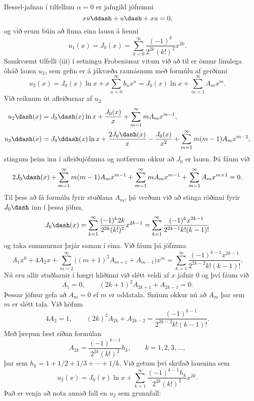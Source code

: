 Bessel-jafnan í tilfellinu ${\alpha}=0$ er jafngild jöfnunni
\begin{equation*}
xu\ddash+u\dash+xu=0,
\label{3.5.5}
\end{equation*}
og við erum búin að finna eina lausn á henni
$$
u_1(x)=J_0(x)=\sum\limits_{k=0}^{\infty}
\dfrac{(-1)^k}{2^{2k}(k!)^2}x^{2k}.
$$
Samkvæmt tilfelli (iii) í setningu Frobeniusar vitum við að
til er önnur línulega óháð lausn $u_2$, sem gefin er á jákvæða raunásnum
með formúlu af gerðinni
\begin{equation*}
u_2(x)=J_0(x)\ln x+x\sum\limits_{n=0}^{\infty} b_nx^n
=J_0(x)\ln x+\sum\limits_{m=1}^{\infty} A_mx^m.
\label{3.5.6}
\end{equation*}
Við reiknum út afleiðurnar af $u_2$ 
\begin{align*}
u_2\dash(x)&=J_0\dash(x)\ln x +\dfrac{J_0(x)}x+
\sum\limits_{m=1}^{\infty} mA_mx^{m-1},\\
u_2\ddash(x)&= J_0\ddash(x)\ln x+\dfrac{2J_0\dash(x)}x-\dfrac{J_0(x)}{x^2}
+\sum\limits_{m=1}^{\infty} m(m-1)A_mx^{m-2},
\end{align*}
stingum þeim inn í afleiðujöfnuna  og notfærum okkur að $J_0$
er lausn.  Þá fáum við
$$
2J_0\dash(x)+\sum\limits_{m=1}^{\infty} m(m-1)A_mx^{m-1}
+\sum\limits_{m=1}^{\infty} mA_mx^{m-1}
+\sum\limits_{m=1}^{\infty} A_mx^{m+1}=0.
$$
Til þess að fá formúlu fyrir stuðlana $A_m$, þá verðum við að stinga
röðinni fyrir $J_0\dash$ inn í þessa jöfnu,
$$
J_0\dash(x)=\sum \limits_{k=1}^{\infty}
\dfrac{(-1)^k2k}{2^{2k}(k!)^2}x^{2k-1}
=\sum \limits_{k=1}^{\infty}
\dfrac{(-1)^kx^{2k-1}}{2^{2k-1}k!(k-1)!}
$$
og taka summurnar þrjár saman í eina.  Við fáum þá jöfnuna 
$$
A_1x^0+4A_2x+\sum\limits_{m=2}^{\infty} 
\big((m+1)^2A_{m+1}+A_{m-1}\big)x^m
=\sum \limits_{k=1}^{\infty}
\dfrac{(-1)^{k-1}x^{2k-1}}{2^{2k-2}k!(k-1)!}.
$$
Nú eru allir stuðlarnir í hægri hliðinni við slétt veldi af $x$ 
 jafnir $0$ og því fáum við
$$
A_1=0, \qquad   (2k+1)^2A_{2k+1}+A_{2k-1}=0.
$$
Þessar jöfnur gefa að $A_m=0$ ef $m$ er oddatala.  Snúum okkur nú  að $A_m$
þar sem $m$ er slétt tala.  Við höfum
$$
4A_2=1, \qquad (2k)^2A_{2k}+A_{2k-2}=
\dfrac{(-1)^{k-1}}{2^{2k-2}k!(k-1)!}.
$$
Með þrepun fæst síðan formúlan
$$
A_{2k}=\dfrac{(-1)^{k-1}}{2^{2k}(k!)^2} h_k, \qquad k=1,2,3,\dots,
$$
þar sem $h_k=1+1/2+1/3+\cdots+1/k$.
Við getum því skrifað lausnina  sem
$$
u_2(x)= J_0(x)\ln x+
\sum\limits_{k=1}^{\infty}
\dfrac{(-1)^{k-1}h_k}{2^{2k}(k!)^2} x^{2k}.
$$
Það er venja að nota annað fall en $u_2$ sem grunnfall:


